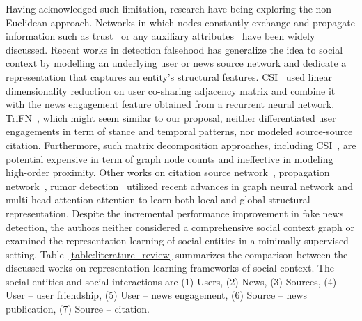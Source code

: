 \documentclass[fyp]{socreport}
\theoremstyle{definition}
\theoremstyle{hypothesis}
\begin{document}
Having acknowledged such limitation, research have being exploring the non-Euclidean approach. Networks in which nodes constantly exchange and propagate information such as trust~\cite{kamvar2003eigentrust} or any auxiliary attributes~\cite{liao2018attributed} have been widely discussed. Recent works in detection falsehood has generalize the idea to social context by modelling an underlying user or news source network and dedicate a representation that captures an entity's structural features. CSI~\cite{ruchansky2017csi} used linear dimensionality reduction on user co-sharing adjacency matrix and combine it with the news engagement feature obtained from a recurrent neural network. TriFN~\cite{shu2019beyond}, which might seem similar to our proposal, neither differentiated user engagements in term of stance and temporal patterns, nor modeled source-source citation. Furthermore, such matrix decomposition approaches, including CSI~\cite{ruchansky2017csi}, are potential expensive in term of graph node counts and ineffective in modeling high-order proximity. Other works on citation source network~\cite{kulkarni2018multi}, propagation network~\cite{monti2019fake}, rumor detection~\cite{yuan2019jointly} utilized recent advances in graph neural network and multi-head attention attention to learn both local and global structural representation. Despite the incremental performance improvement in fake news detection, the authors neither considered a comprehensive social context graph or examined the representation learning of social entities in a minimally supervised setting. Table~\ref{table:literature_review} summarizes the comparison between the discussed works on representation learning frameworks of social context. The social entities and social interactions are (1) Users, (2) News, (3) Sources, (4) User -- user friendship, (5) User -- news engagement, (6) Source -- news publication, (7) Source -- citation.
\end{document}
